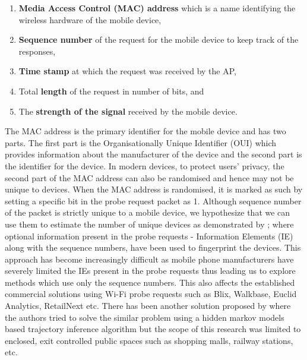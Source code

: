 \begin{enumerate} 
\item \textbf{Media Access Control (MAC) address} which is a name identifying the wireless hardware of the mobile device, 
\item \textbf{Sequence number} of the request for the mobile device to keep track of the responses, 
\item \textbf{Time stamp} at which the request was received by the AP, 
\item Total \textbf{length} of the request in number of bits, and 
\item The \textbf{strength of the signal} received by the mobile device.
\end{enumerate}

The MAC address is the primary identifier for the mobile device and has two parts.
The first part is the Organisationally Unique Identifier (OUI) which provides information about the manufacturer of the device and the second part is the identifier for the device.
In modern devices, to protect users' privacy, the second part of the MAC address can also be randomised and hence may not be unique to devices.
When the MAC address is randomised, it is marked as such by setting a specific bit in the probe request packet as 1.
Although sequence number of the packet is strictly unique to a mobile device, we hypothesize that we can use them to estimate the number of unique devices as demonstrated by \citep{vanhoef2016}; where optional information present in the probe requests - Information Elements (IE) along with the sequence numbers, have been used to fingerprint the devices.
This approach has become increasingly difficult as mobile phone manufacturers have severely limited the IEs present in the probe requests thus leading us to explore methods which use only the sequence numbers.
This also affects the established commercial solutions using Wi-Fi probe requests such as Blix, Walkbase, Euclid Analytics, RetailNext etc.
There has been another solution proposed by \citep{hong2018} where the authors tried to solve the similar problem using a hidden markov models based trajectory inference algorithm but the scope of this research was limited to enclosed, exit controlled public spaces such as shopping malls, railway stations, etc.

